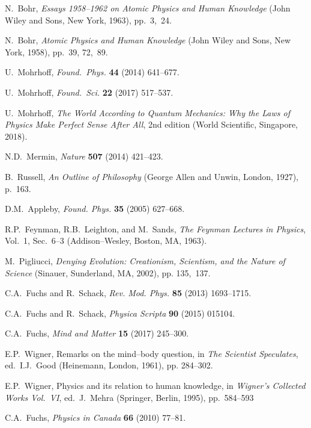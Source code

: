 \documentclass[12pt]{article}
\begin{document}
\begin{thebibliography}{99}
 N.\ Bohr, \emph{Essays 1958--1962 on Atomic Physics and Human Knowledge} (John Wiley and Sons, New York, 1963), pp.\ 3,~24.

 N.\ Bohr, \emph{Atomic Physics and Human Knowledge} (John Wiley and Sons, New York, 1958),  pp.\ 39, 72,~89.

 U.\ Mohrhoff, \textit{Found.\ Phys.} \textbf{44} (2014) 641--677.

 U.\ Mohrhoff, \emph{Found.\ Sci.} \textbf{22} (2017) 517--537.

 U.\ Mohrhoff, \emph{The World According to Quantum Mechanics: Why the Laws of Physics Make Perfect Sense After All}, 2nd edition (World Scientific, Singapore, 2018).

 N.D.\ Mermin, \emph{Nature} \textbf{507} (2014) 421--423.

 B.\ Russell, \textit{An Outline of Philosophy} (George Allen and Unwin, London, 1927), p.~163.

 D.M.\ Appleby, \emph{Found. Phys.} \textbf{35} (2005) 627--668.

 R.P.\ Feynman, R.B.\ Leighton, and M.\ Sands, \emph{The Feynman Lectures in Physics}, Vol.~1, Sec.~6--3 (Addison--Wesley, Boston, MA, 1963).

 M.\ Pigliucci,  \textit{Denying Evolution: Creationism, Scientism, and the Nature of Science} (Sinauer, Sunderland, MA, 2002), pp. 135,~137.

 C.A.\ Fuchs and R.\ Schack, \emph{Rev. Mod. Phys.} \textbf{85} (2013) 1693--1715.

 C.A.\ Fuchs  and R.\ Schack, \textit{Physica Scripta} \textbf{90} (2015) 015104.

 C.A.\ Fuchs, \textit{Mind and Matter} \textbf{15} (2017) 245--300.

 E.P.\ Wigner, Remarks on the mind--body question, in \emph{The Scientist Speculates}, ed.\ I.J.\ Good (Heinemann, London, 1961), pp. 284--302.

 E.P.\ Wigner, Physics and its relation to human knowledge, in \textit{Wigner's Collected Works Vol.\ VI}, ed.\ J.\ Mehra (Springer, Berlin, 1995), pp.\ 584--593

 C.A.\ Fuchs, \textit{Physics in Canada} \textbf{66} (2010) 77--81.


\end{thebibliography}
\end{document}
